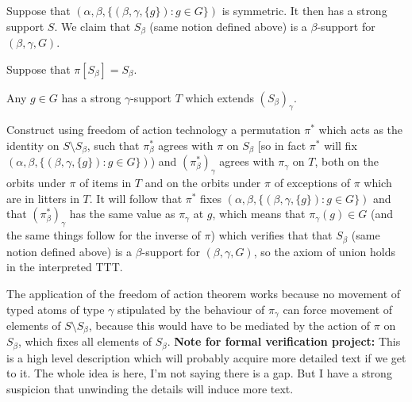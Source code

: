 Suppose that $(\alpha,\beta,\{(\beta,\gamma,\{g\}):g \in G\})$ is symmetric.  It then has a strong support $S$.  We claim that $S_\beta$ (same notion defined above) is a $\beta$-support for $(\beta,\gamma,G)$.

Suppose that $\pi[S_\beta]=S_\beta$.

Any $g \in G$ has a strong $\gamma$-support $T$ which extends $(S_\beta)_\gamma$.

Construct using freedom of action technology a permutation $\pi^*$ which acts as the identity on $S \setminus S_\beta$, such that $\pi^*_\beta$ agrees with $\pi$ on $S_\beta$ [so in fact $\pi^*$ will fix $(\alpha,\beta,\{(\beta,\gamma,\{g\}):g \in G\})$) and $(\pi^*_\beta)_\gamma$ agrees with $\pi_\gamma$ on $T$, both on the orbits under $\pi$ of items in $T$ and on the orbits under $\pi$ of exceptions of $\pi$ which are in litters in $T$.  It will follow that $\pi^*$ fixes $(\alpha,\beta,\{(\beta,\gamma,\{g\}):g \in G\})$ and that $(\pi^*_\beta)_\gamma$ has the same value as $\pi_\gamma$ at $g$, which means that $\pi_\gamma(g) \in G$ (and the same things follow for the inverse of $\pi$) which verifies that that $S_\beta$ (same notion defined above) is a $\beta$-support for $(\beta,\gamma,G)$, so the axiom of union holds in the interpreted TTT.

The application of the freedom of action theorem works because no movement of typed atoms of type $\gamma$ stipulated by the behaviour of $\pi_\gamma$ can force
movement of elements of $S \setminus S_\beta$, because this would have to be mediated by the action of $\pi$ on $S_\beta$, which fixes all elements of $S_\beta$.
{\bf Note for formal verification project:}  This is a high level description which will probably acquire more detailed text if we get to it.  The whole idea is here, I'm not saying there is a gap.  But I have a strong suspicion that unwinding the details will induce more text.


